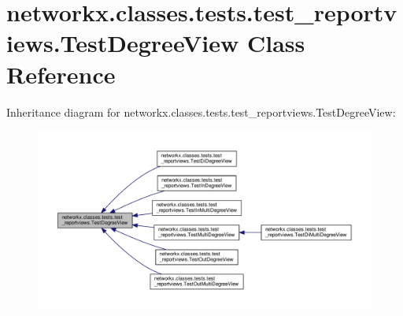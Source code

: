 \hypertarget{classnetworkx_1_1classes_1_1tests_1_1test__reportviews_1_1TestDegreeView}{}\section{networkx.\+classes.\+tests.\+test\+\_\+reportviews.\+Test\+Degree\+View Class Reference}
\label{classnetworkx_1_1classes_1_1tests_1_1test__reportviews_1_1TestDegreeView}


Inheritance diagram for networkx.\+classes.\+tests.\+test\+\_\+reportviews.\+Test\+Degree\+View\+:
\nopagebreak
\begin{figure}[H]
\begin{center}
\leavevmode
\includegraphics[width=350pt]{classnetworkx_1_1classes_1_1tests_1_1test__reportviews_1_1TestDegreeView__inherit__graph}
\end{center}
\end{figure}
